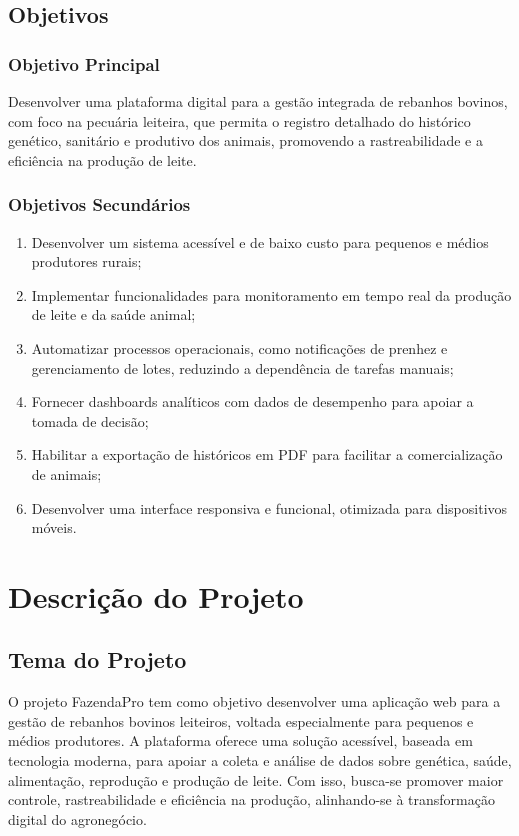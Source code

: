 \documentclass[12pt, a4paper]{article}
\begin{document}
\subsection{Objetivos}
\begin{spacing}{1.5}
\subsubsection{Objetivo Principal}
Desenvolver uma plataforma digital para a gestão integrada de rebanhos bovinos, com foco na pecuária leiteira, que permita o registro detalhado do histórico genético, sanitário e produtivo dos animais, promovendo a rastreabilidade e a eficiência na produção de leite.

\subsubsection{Objetivos Secundários}
\begin{enumerate}[label=\alph*)]
    \item Desenvolver um sistema acessível e de baixo custo para pequenos e médios produtores rurais;
    \item Implementar funcionalidades para monitoramento em tempo real da produção de leite e da saúde animal;
    \item Automatizar processos operacionais, como notificações de prenhez e gerenciamento de lotes, reduzindo a dependência de tarefas manuais;
    \item Fornecer dashboards analíticos com dados de desempenho para apoiar a tomada de decisão;
    \item Habilitar a exportação de históricos em PDF para facilitar a comercialização de animais;
    \item Desenvolver uma interface responsiva e funcional, otimizada para dispositivos móveis.
\end{enumerate}

\section{Descrição do Projeto}

\subsection{Tema do Projeto}

\begin{spacing}{1.5}
O projeto FazendaPro tem como objetivo desenvolver uma aplicação web para a gestão de rebanhos bovinos leiteiros, voltada especialmente para pequenos e médios produtores. A plataforma oferece uma solução acessível, baseada em tecnologia moderna, para apoiar a coleta e análise de dados sobre genética, saúde, alimentação, reprodução e produção de leite. Com isso, busca-se promover maior controle, rastreabilidade e eficiência na produção, alinhando-se à transformação digital do agronegócio.
\end{spacing}


\end{spacing}
\end{document}

